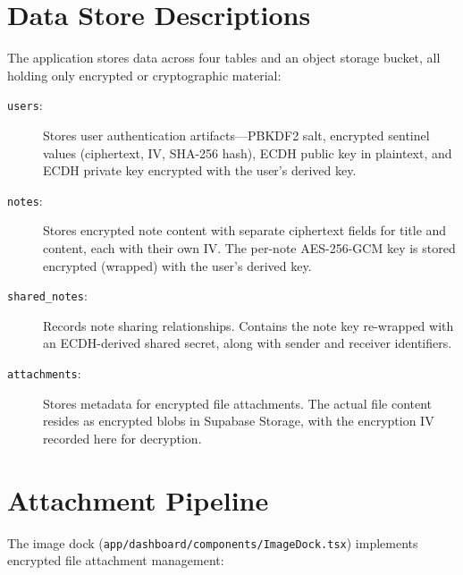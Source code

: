 \section{Data Store Descriptions}

The application stores data across four tables and an object storage bucket, all holding only encrypted or cryptographic material:

\begin{description}
    \item[\texttt{users}:] Stores user authentication artifacts---PBKDF2 salt, encrypted sentinel values (ciphertext, IV, SHA-256 hash), ECDH public key in plaintext, and ECDH private key encrypted with the user's derived key.

    \item[\texttt{notes}:] Stores encrypted note content with separate ciphertext fields for title and content, each with their own IV. The per-note AES-256-GCM key is stored encrypted (wrapped) with the user's derived key.

    \item[\texttt{shared\_notes}:] Records note sharing relationships. Contains the note key re-wrapped with an ECDH-derived shared secret, along with sender and receiver identifiers.

    \item[\texttt{attachments}:] Stores metadata for encrypted file attachments. The actual file content resides as encrypted blobs in Supabase Storage, with the encryption IV recorded here for decryption.
\end{description}

\section{Attachment Pipeline}

The image dock (\texttt{app/dashboard/components/ImageDock.tsx}) implements encrypted file attachment management:


